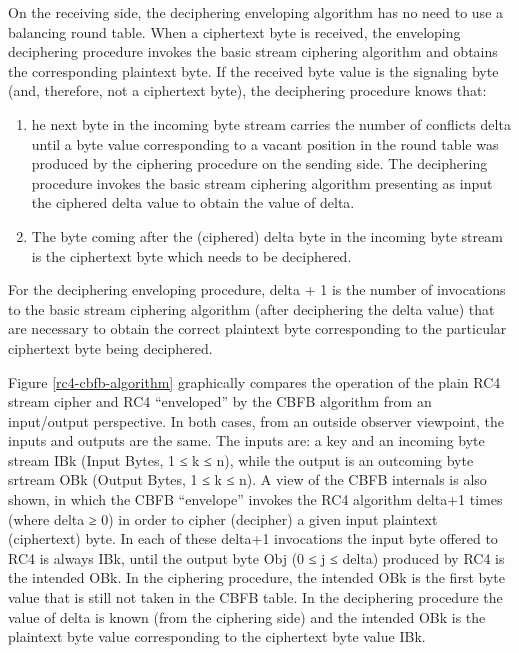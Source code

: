 \documentclass[conference]{IEEEtran}
\begin{document}
On the receiving side, the deciphering enveloping algorithm has no need to use a balancing round table. When a ciphertext byte is received, the enveloping deciphering procedure invokes the basic stream ciphering algorithm and obtains the corresponding plaintext byte. If the received byte value is the signaling byte (and, therefore, not a ciphertext byte), the deciphering procedure knows that: 

\begin{enumerate}
	\item he next byte in the incoming byte stream carries the number of conflicts delta until a byte value corresponding to a vacant position in the round table was produced by the ciphering procedure on the sending side. The deciphering procedure invokes the basic stream ciphering algorithm presenting as input the ciphered delta value to obtain the value of delta.
	\item The byte coming after the (ciphered) delta byte in the incoming byte stream is the ciphertext byte which needs to be deciphered.
\end{enumerate}

For the deciphering enveloping procedure, delta + 1 is the number of invocations to the basic stream ciphering algorithm (after deciphering the delta value)  that are necessary to obtain the correct plaintext byte corresponding to the particular ciphertext byte being deciphered. 

Figure \ref{rc4-cbfb-algorithm} graphically compares the operation of the plain RC4 stream cipher and RC4 “enveloped” by the CBFB algorithm from an input/output perspective. In both cases, from an outside observer viewpoint, the inputs and outputs are the same. The inputs are: a key and an incoming byte stream IBk (Input Bytes, 1 ≤ k ≤ n), while the output is an outcoming byte srtream OBk (Output Bytes, 1 ≤ k ≤ n). A view of the CBFB internals is also shown, in which the CBFB “envelope” invokes the RC4 algorithm delta+1 times (where delta ≥ 0) in order to cipher (decipher) a given input plaintext (ciphertext) byte. In each of these delta+1 invocations the input byte offered to RC4 is always IBk, until the output byte Obj (0 ≤  j ≤  delta) produced by RC4 is the intended OBk. In the ciphering procedure, the intended OBk is the first byte value that is still not taken in the CBFB table. In the deciphering procedure the value of delta is known (from the ciphering side) and the intended OBk is the plaintext byte value corresponding to the ciphertext byte value IBk.
\end{document}
